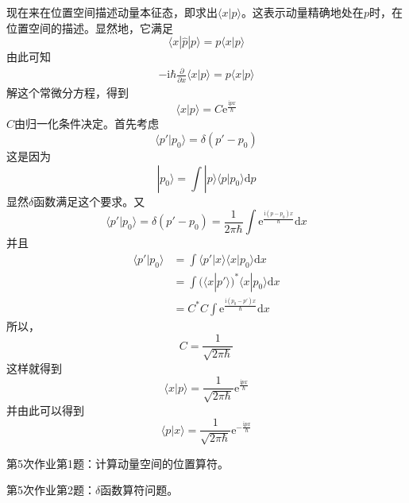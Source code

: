         现在来在位置空间描述动量本征态，即求出$\langle x|p \rangle$。这表示动量精确地处在$p$时，在位置空间的描述。显然地，它满足
        \begin{equation}
            \langle x|\hat{p}|p\rangle = p\langle x|p \rangle
        \end{equation}
        由此可知 
        \begin{equation}\begin{aligned}
            -\mathrm{i}\hbar \frac {\partial}{\partial x} \langle x|p \rangle = p \langle x|p \rangle
        \end{aligned}\end{equation}
        解这个常微分方程，得到
        \begin{equation}
            \langle x|p \rangle = C \mathrm{e}^{\frac {\mathrm{i}px}\hbar}
        \end{equation}
        $C$由归一化条件决定。首先考虑
        \begin{equation}
            \langle p' | p_0 \rangle = \delta (p'-p_0)
        \end{equation}
        这是因为
        \begin{equation}
            |p_0 \rangle = \int |p\rangle \langle p|p_0\rangle \mathrm{d}p
        \end{equation}
        显然$\delta$函数满足这个要求。又
        \begin{equation}
            \langle p' | p_0 \rangle = \delta (p'-p_0) = \frac 1{2\pi\hbar} \int \mathrm{e}^{\frac {\mathrm{i}(p-p_0)x}{\hbar}} \mathrm{d}x
        \end{equation}
        并且
        \begin{equation}\begin{aligned}
            \langle p'|p_0 \rangle &= \int \langle p'|x\rangle \langle x|p_0 \rangle \mathrm{d}x\\
            &= \int (\langle x|p' \rangle)^* \langle x|p_0 \rangle \mathrm{d}x\\
            &= C^*C\int \mathrm{e}^{\frac {\mathrm{i}(p_0-p')x}{\hbar}} \mathrm{d}x
        \end{aligned}\end{equation}
        所以， 
        \begin{equation}
            C = \frac 1{\sqrt{2\pi\hbar}}
        \end{equation}
        这样就得到 
        \begin{equation}
            \langle x|p \rangle = \frac 1{\sqrt{2\pi\hbar}} \mathrm{e}^{\frac {\mathrm{i}px}{\hbar}}
        \end{equation}
        并由此可以得到
        \begin{equation}
            \langle p|x \rangle = \frac 1{\sqrt{2\pi\hbar}} \mathrm{e}^{-\frac {\mathrm{i}px}{\hbar}}
        \end{equation}
        \begin{asg}
            第5次作业第1题：计算动量空间的位置算符。
        \end{asg}
        \begin{asg}
            第5次作业第2题：$\delta$函数算符问题。
        \end{asg}

